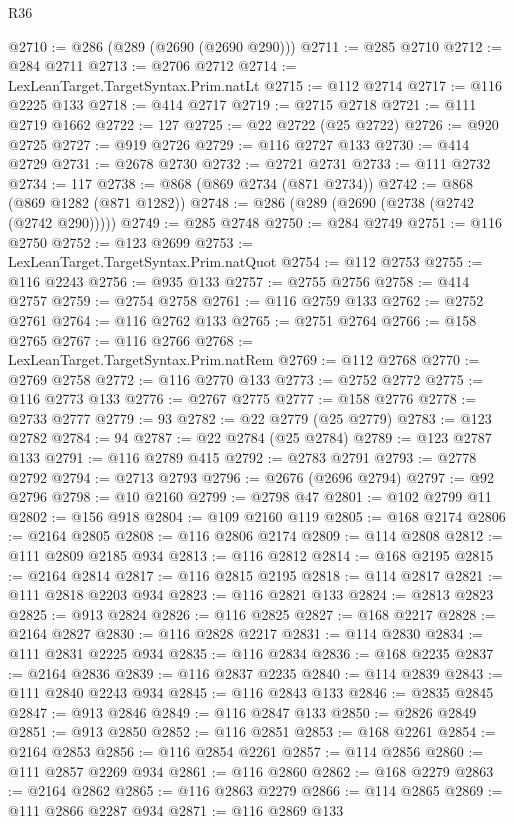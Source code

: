 \begin{lexlean}{R36}
\begin{coremodule}
@2710 := @286 (@289 (@2690 (@2690 @290)))
@2711 := @285 @2710
@2712 := @284 @2711
@2713 := @2706 @2712
@2714 := LexLeanTarget.TargetSyntax.Prim.natLt
@2715 := @112 @2714
@2717 := @116 @2225 @133
@2718 := @414 @2717
@2719 := @2715 @2718
@2721 := @111 @2719 @1662
@2722 := 127
@2725 := @22 @2722 (@25 @2722)
@2726 := @920 @2725
@2727 := @919 @2726
@2729 := @116 @2727 @133
@2730 := @414 @2729
@2731 := @2678 @2730
@2732 := @2721 @2731
@2733 := @111 @2732
@2734 := 117
@2738 := @868 (@869 @2734 (@871 @2734))
@2742 := @868 (@869 @1282 (@871 @1282))
@2748 := @286 (@289 (@2690 (@2738 (@2742 (@2742 @290)))))
@2749 := @285 @2748
@2750 := @284 @2749
@2751 := @116 @2750
@2752 := @123 @2699
@2753 := LexLeanTarget.TargetSyntax.Prim.natQuot
@2754 := @112 @2753
@2755 := @116 @2243
@2756 := @935 @133
@2757 := @2755 @2756
@2758 := @414 @2757
@2759 := @2754 @2758
@2761 := @116 @2759 @133
@2762 := @2752 @2761
@2764 := @116 @2762 @133
@2765 := @2751 @2764
@2766 := @158 @2765
@2767 := @116 @2766
@2768 := LexLeanTarget.TargetSyntax.Prim.natRem
@2769 := @112 @2768
@2770 := @2769 @2758
@2772 := @116 @2770 @133
@2773 := @2752 @2772
@2775 := @116 @2773 @133
@2776 := @2767 @2775
@2777 := @158 @2776
@2778 := @2733 @2777
@2779 := 93
@2782 := @22 @2779 (@25 @2779)
@2783 := @123 @2782
@2784 := 94
@2787 := @22 @2784 (@25 @2784)
@2789 := @123 @2787 @133
@2791 := @116 @2789 @415
@2792 := @2783 @2791
@2793 := @2778 @2792
@2794 := @2713 @2793
@2796 := @2676 (@2696 @2794)
@2797 := @92 @2796
@2798 := @10 @2160
@2799 := @2798 @47
@2801 := @102 @2799 @11
@2802 := @156 @918
@2804 := @109 @2160 @119
@2805 := @168 @2174
@2806 := @2164 @2805
@2808 := @116 @2806 @2174
@2809 := @114 @2808
@2812 := @111 @2809 @2185 @934
@2813 := @116 @2812
@2814 := @168 @2195
@2815 := @2164 @2814
@2817 := @116 @2815 @2195
@2818 := @114 @2817
@2821 := @111 @2818 @2203 @934
@2823 := @116 @2821 @133
@2824 := @2813 @2823
@2825 := @913 @2824
@2826 := @116 @2825
@2827 := @168 @2217
@2828 := @2164 @2827
@2830 := @116 @2828 @2217
@2831 := @114 @2830
@2834 := @111 @2831 @2225 @934
@2835 := @116 @2834
@2836 := @168 @2235
@2837 := @2164 @2836
@2839 := @116 @2837 @2235
@2840 := @114 @2839
@2843 := @111 @2840 @2243 @934
@2845 := @116 @2843 @133
@2846 := @2835 @2845
@2847 := @913 @2846
@2849 := @116 @2847 @133
@2850 := @2826 @2849
@2851 := @913 @2850
@2852 := @116 @2851
@2853 := @168 @2261
@2854 := @2164 @2853
@2856 := @116 @2854 @2261
@2857 := @114 @2856
@2860 := @111 @2857 @2269 @934
@2861 := @116 @2860
@2862 := @168 @2279
@2863 := @2164 @2862
@2865 := @116 @2863 @2279
@2866 := @114 @2865
@2869 := @111 @2866 @2287 @934
@2871 := @116 @2869 @133

\end{coremodule}
\end{lexlean}

